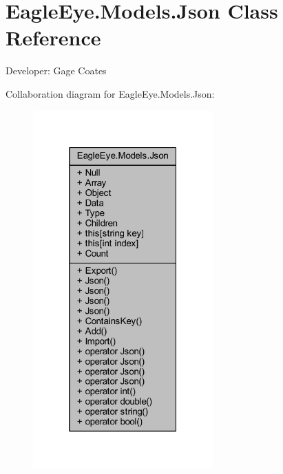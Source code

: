 \hypertarget{class_eagle_eye_1_1_models_1_1_json}{}\section{Eagle\+Eye.\+Models.\+Json Class Reference}
\label{class_eagle_eye_1_1_models_1_1_json}


Developer\+: Gage Coates  




Collaboration diagram for Eagle\+Eye.\+Models.\+Json\+:\nopagebreak
\begin{figure}[H]
\begin{center}
\leavevmode
\includegraphics[width=196pt]{class_eagle_eye_1_1_models_1_1_json__coll__graph}
\end{center}
\end{figure}
